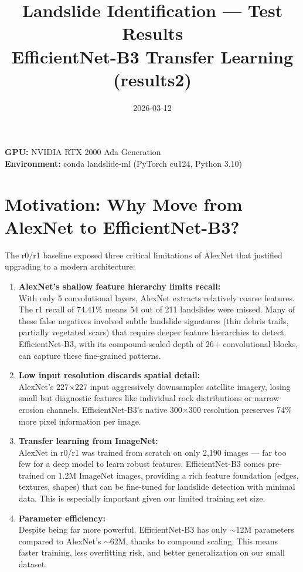 \documentclass[11pt]{article}
\title{Landslide Identification — Test Results \\ \large EfficientNet-B3 Transfer Learning (results2)}
\author{}
\date{2026-03-12}
\begin{document}
\maketitle

\noindent\textbf{GPU:} NVIDIA RTX 2000 Ada Generation \\
\textbf{Environment:} conda landslide-ml (PyTorch cu124, Python 3.10) \\

\section{Motivation: Why Move from AlexNet to EfficientNet-B3?}

The r0/r1 baseline exposed three critical limitations of AlexNet that justified upgrading to a modern architecture:

\begin{enumerate}
    \item \textbf{AlexNet's shallow feature hierarchy limits recall:}\\
          With only 5 convolutional layers, AlexNet extracts relatively coarse features. The r1 recall of 74.41\% means 54 out of 211 landslides were missed. Many of these false negatives involved subtle landslide signatures (thin debris trails, partially vegetated scars) that require deeper feature hierarchies to detect. EfficientNet-B3, with its compound-scaled depth of 26+ convolutional blocks, can capture these fine-grained patterns.

    \item \textbf{Low input resolution discards spatial detail:}\\
          AlexNet's 227$\times$227 input aggressively downsamples satellite imagery, losing small but diagnostic features like individual rock distributions or narrow erosion channels. EfficientNet-B3's native 300$\times$300 resolution preserves 74\% more pixel information per image.

    \item \textbf{Transfer learning from ImageNet:}\\
          AlexNet in r0/r1 was trained from scratch on only 2,190 images --- far too few for a deep model to learn robust features. EfficientNet-B3 comes pre-trained on 1.2M ImageNet images, providing a rich feature foundation (edges, textures, shapes) that can be fine-tuned for landslide detection with minimal data. This is especially important given our limited training set size.

    \item \textbf{Parameter efficiency:}\\
          Despite being far more powerful, EfficientNet-B3 has only $\sim$12M parameters compared to AlexNet's $\sim$62M, thanks to compound scaling. This means faster training, less overfitting risk, and better generalization on our small dataset.
\end{enumerate}
\end{document}
